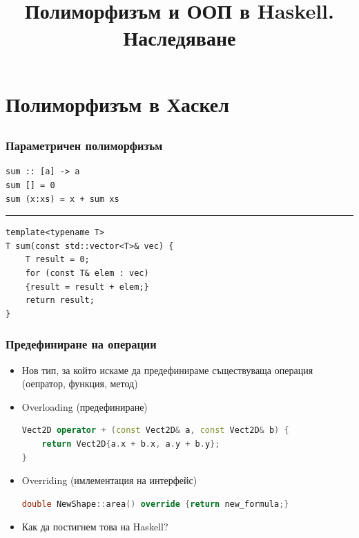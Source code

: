 \documentclass{beamer}
\begin{document}
\title[Наследяване]{Полиморфизъм и ООП в Haskell. Наследяване}
\frame{\titlepage}

\section{Полиморфизъм в Хаскел}

\subsection{}



\begin{frame}[fragile]
\frametitle{Параметричен полиморфизъм}

\begin{lstlisting}[basicstyle=\small]
sum :: [a] -> a
sum [] = 0
sum (x:xs) = x + sum xs
\end{lstlisting}

\begin{center}
\noindent\rule{6cm}{0.4pt}
\end{center}

\begin{lstlisting}[basicstyle=\small]
template<typename T>
T sum(const std::vector<T>& vec) {
    T result = 0;
    for (const T& elem : vec) 
    {result = result + elem;}
    return result;
}
\end{lstlisting}

\end{frame}


\begin{frame}[fragile]
\frametitle{Предефиниране на операции}

\begin{itemize}
  \item Нов тип, за който искаме да предефинираме съществуваща операция (оепратор, функция, метод)
  \item Overloading (предефиниране)
\begin{lstlisting}[language=c++,basicstyle=\small]
Vect2D operator + (const Vect2D& a, const Vect2D& b) {
    return Vect2D{a.x + b.x, a.y + b.y};
}
\end{lstlisting}

  \item Overriding (имлементация на интерфейс)
\begin{lstlisting}[language=c++,basicstyle=\small]
double NewShape::area() override {return new_formula;}
\end{lstlisting}
\end{itemize}

\begin{itemize}
  \item Как да постигнем това на Haskell?
\end{itemize}

\end{frame}
\end{document}
